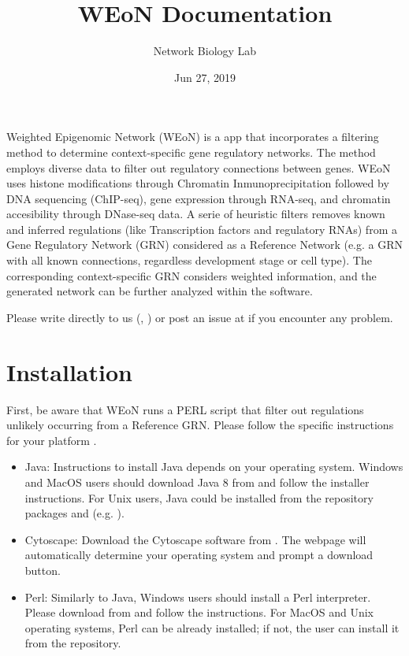 \documentclass[letterpaper,10pt,english]{sphinxmanual}
\title{WEoN Documentation}
\date{Jun 27, 2019}
\author{Network Biology Lab}
\begin{document}
\pagestyle{empty}
\sphinxmaketitle
\pagestyle{plain}
\sphinxtableofcontents
\pagestyle{normal}
\label{\detokenize{index::doc}}


Weighted Epigenomic Network (WEoN) is a  app that incorporates a filtering method to determine context-specific gene regulatory networks. The method employs diverse data to filter out regulatory connections between genes. WEoN uses histone modifications through Chromatin Inmunoprecipitation followed by DNA sequencing (ChIP-seq), gene expression through RNA-seq, and chromatin accesibility through DNase-seq data. A serie of heuristic filters removes known and inferred regulations (like Transcription factors and regulatory RNAs) from a Gene Regulatory Network (GRN) considered as a Reference Network (e.g. a GRN with all known connections, regardless development stage or cell type). The corresponding context-specific GRN considers weighted information, and the generated network can be further analyzed within the  software.

Please write directly to us (, ) or post an issue at  if you encounter any problem.


\chapter{Installation}
\label{\detokenize{installation:installation}}\label{\detokenize{installation::doc}}
First, be aware that WEoN runs a PERL script that filter out regulations unlikely occurring from a Reference GRN. Please follow the specific instructions for your platform .

\begin{itemize}
\item {} 
Java: Instructions to install Java depends on your operating system. Windows and MacOS users should download Java 8 from  and follow the installer instructions. For Unix users, Java could be installed from the repository packages  and  (e.g. ).

\item {} 
Cytoscape: Download the Cytoscape software from . The webpage will automatically determine your operating system and prompt a download button.

\item {} 
Perl: Similarly to Java, Windows users should install a Perl interpreter. Please download from  and follow the instructions. For MacOS and Unix operating systems, Perl can be already installed; if not, the user can install it from the repository.

\end{itemize}
\end{document}
